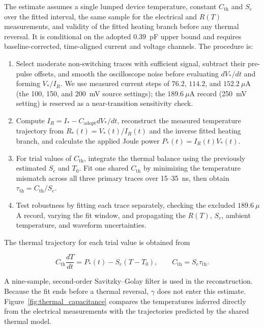 \documentclass[11pt]{article}
\begin{document}
The estimate assumes a single lumped device temperature, constant $C_{\mathrm{th}}$
and $S_e$ over the fitted interval, the same sample for the electrical and $R(T)$
measurements, and validity of the fitted heating branch before any thermal reversal.
It is conditional on the adopted $0.39$~pF upper bound and requires
baseline-corrected, time-aligned current and voltage channels. The procedure is:

\begin{enumerate}
\item Select moderate non-switching traces with sufficient signal, subtract their
pre-pulse offsets, and smooth the oscilloscope noise before evaluating $dV_*/dt$
and forming $V_*/I_R$. We
use measured current steps of $76.2$, $114.2$, and $152.2~\mu$A (the 100, 150,
and 200~mV source settings); the $189.6~\mu$A record (250~mV setting) is reserved
as a near-transition sensitivity check.
\item Compute $I_R=I_*-C_{\mathrm{adopt}}dV_*/dt$, reconstruct the measured
temperature trajectory from $R_*(t)=V_*(t)/I_R(t)$ and the inverse fitted heating
branch, and calculate the applied Joule power $P_*(t)=I_R(t)V_*(t)$.
\item For trial values of $C_{\mathrm{th}}$, integrate the thermal balance using
the previously estimated $S_e$ and $T_0$. Fit one shared $C_{\mathrm{th}}$ by
minimizing the temperature mismatch across all three primary traces over
15--35~ns, then obtain $\tau_{\mathrm{th}}=C_{\mathrm{th}}/S_e$.
\item Test robustness by fitting each trace separately, checking the excluded
$189.6~\mu$A record, varying the fit window, and propagating the $R(T)$, $S_e$,
ambient temperature, and waveform uncertainties.
\end{enumerate}

The thermal trajectory for each trial value is obtained from

\begin{equation}
C_{\mathrm{th}}\frac{dT}{dt}=P_*(t)-S_e(T-T_0),
\qquad
C_{\mathrm{th}}=S_e\tau_{\mathrm{th}}.
\end{equation}

A nine-sample, second-order Savitzky--Golay filter is used in the reconstruction.
Because the fit ends before a thermal reversal, $\gamma$ does not enter this
estimate. Figure~\ref{fig:thermal_capacitance} compares the temperatures inferred
directly from the electrical measurements with the trajectories predicted by the
shared thermal model.
\end{document}
